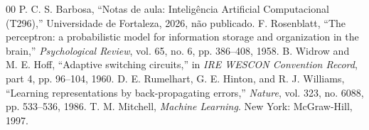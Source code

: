 \documentclass[conference]{IEEEtran}
\begin{document}
\begin{thebibliography}{00}
 P. C. S. Barbosa, ``Notas de aula: Inteligência Artificial Computacional (T296),'' Universidade de Fortaleza, 2026, não publicado.
 F. Rosenblatt, ``The perceptron: a probabilistic model for information storage and organization in the brain,'' \textit{Psychological Review}, vol. 65, no. 6, pp. 386--408, 1958.
 B. Widrow and M. E. Hoff, ``Adaptive switching circuits,'' in \textit{IRE WESCON Convention Record}, part 4, pp. 96--104, 1960.
 D. E. Rumelhart, G. E. Hinton, and R. J. Williams, ``Learning representations by back-propagating errors,'' \textit{Nature}, vol. 323, no. 6088, pp. 533--536, 1986.
 T. M. Mitchell, \textit{Machine Learning}. New York: McGraw-Hill, 1997.
\end{thebibliography}
\end{document}
